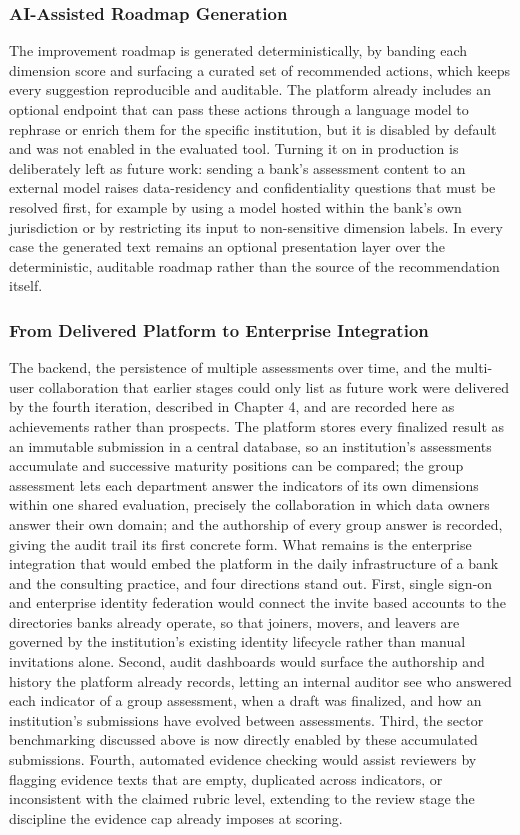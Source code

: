 \subsubsection{AI-Assisted Roadmap Generation}

The improvement roadmap is generated deterministically, by banding each dimension score and surfacing a curated set of recommended actions, which keeps every suggestion reproducible and auditable. The platform already includes an optional endpoint that can pass these actions through a language model to rephrase or enrich them for the specific institution, but it is disabled by default and was not enabled in the evaluated tool. Turning it on in production is deliberately left as future work: sending a bank's assessment content to an external model raises data-residency and confidentiality questions that must be resolved first, for example by using a model hosted within the bank's own jurisdiction or by restricting its input to non-sensitive dimension labels. In every case the generated text remains an optional presentation layer over the deterministic, auditable roadmap rather than the source of the recommendation itself.

\subsubsection{From Delivered Platform to Enterprise Integration}

The backend, the persistence of multiple assessments over time, and the multi-user collaboration that earlier stages could only list as future work were delivered by the fourth iteration, described in Chapter 4, and are recorded here as achievements rather than prospects. The platform stores every finalized result as an immutable submission in a central database, so an institution's assessments accumulate and successive maturity positions can be compared; the group assessment lets each department answer the indicators of its own dimensions within one shared evaluation, precisely the collaboration in which data owners answer their own domain; and the authorship of every group answer is recorded, giving the audit trail its first concrete form. What remains is the enterprise integration that would embed the platform in the daily infrastructure of a bank and the consulting practice, and four directions stand out. First, single sign-on and enterprise identity federation would connect the invite based accounts to the directories banks already operate, so that joiners, movers, and leavers are governed by the institution's existing identity lifecycle rather than manual invitations alone. Second, audit dashboards would surface the authorship and history the platform already records, letting an internal auditor see who answered each indicator of a group assessment, when a draft was finalized, and how an institution's submissions have evolved between assessments. Third, the sector benchmarking discussed above is now directly enabled by these accumulated submissions. Fourth, automated evidence checking would assist reviewers by flagging evidence texts that are empty, duplicated across indicators, or inconsistent with the claimed rubric level, extending to the review stage the discipline the evidence cap already imposes at scoring.

